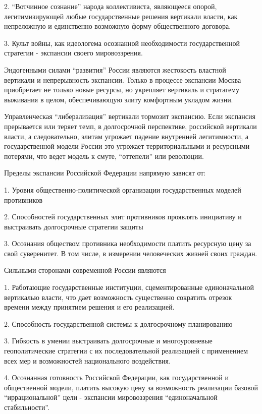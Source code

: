 2. \enquote{Вотчинное сознание} народа коллективиста, являющееся опорой,
легитимизирующей любые государственные решения вертикали власти, как
непреложную и единственно возможную форму общественного договора.

3. Культ войны, как идеологема осознанной необходимости государственной
стратегии - экспансии своего мировоззрения.

Эндогенными силами \enquote{развития} России являются жестокость властной вертикали и
непрерывность экспансии. Только в процессе экспансии Москва приобретает не
только новые ресурсы, но укрепляет вертикаль и стратагему выживания в целом,
обеспечивающую элиту комфортным укладом жизни.

Управленческая \enquote{либерализация} вертикали тормозит экспансию. Если экспансия
прерывается или теряет темп, в долгосрочной перспективе, российской вертикали
власти, а следовательно, элитам угрожает падение внутренней легитимности, а
государственной модели России это угрожает территориальными и ресурсными
потерями, что ведет модель к смуте, \enquote{оттепели} или революции.

Пределы экспансии Российской Федерации напрямую зависят от:

1. Уровня общественно-политической организации государственных моделей
противников

2. Способностей государственных элит противников проявлять инициативу и
выстраивать долгосрочные стратегии защиты

3. Осознания обществом противника необходимости платить ресурсную цену за свой
суверенитет. В том числе, в измерении человеческих жизней своих граждан.

Сильными сторонами современной России являются

1. Работающие государственные институции, сцементированные единоначальной
вертикалью власти, что дает возможность существенно сократить отрезок времени
между принятием решения и его реализацией.

2. Способность государственной системы к долгосрочному планированию

3. Гибкость в умении выстраивать долгосрочные и многоуровневые геополитические
стратегии с их последовательной реализацией с применением всех мер и
возможностей национального воздействия.

4. Осознанная готовность Российской Федерации, как государственной и
общественной модели, платить высокую цену за возможность реализации базовой
\enquote{иррациональной} цели - экспансии мировоззрения \enquote{единоначальной стабильности}.

